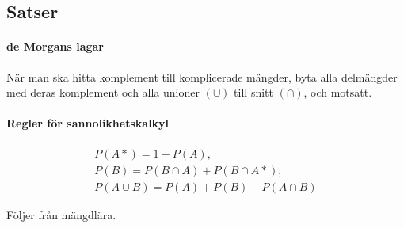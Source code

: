 \subsection{Satser}

\paragraph{de Morgans lagar}
När man ska hitta komplement till komplicerade mängder, byta alla delmängder med deras komplement och alla unioner $(\cup)$ till snitt $(\cap)$, och motsatt.

\paragraph{Regler för sannolikhetskalkyl}
\begin{align*}
	P(A*) = 1 - P(A), \\
	P(B) = P(B\cap A) + P(B\cap A*), \\
	P(A\cup B) = P(A) + P(B) - P(A\cap B)
\end{align*}

\proof
Följer från mängdlära.